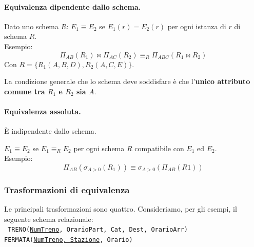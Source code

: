 \documentclass{report}
\begin{document}
\paragraph{Equivalenza dipendente dallo schema.} Dato uno schema $R$:
$E_1 \equiv E_2$ se $E_1(r) = E_2(r)$ per ogni istanza di $r$ di schema $R$.\\
Esempio:
\[ \Pi_{AB}(R_1) \bowtie \Pi_{AC}(R_2) \equiv_R \Pi_{ABC}(R_1 \bowtie R_2) \]
Con $R=\{R_1(A, B, D), R_2(A, C, E)\}$.

La condizione generale che lo schema deve soddisfare \`e che l'\textbf{unico attributo comune tra $R_1$ e $R_2$ sia $A$}.

\paragraph{Equivalenza assoluta.} \`E indipendente dallo schema.

$E_1 \equiv E_2$ se $E_1 \equiv_R E_2$ per ogni schema $R$ compatibile con $E_1$ ed $E_2$.\\
Esempio:
\[ \Pi_{AB}(\sigma_{A>0}(R_1)) \equiv \sigma_{A>0}(\Pi_{AB}(R1))\]


\subsubsection{Trasformazioni di equivalenza}
Le principali trasformazioni sono quattro. Consideriamo, per gli esempi, il seguente schema relazionale:\\
\texttt{
TRENO(\underline{NumTreno}, OrarioPart, Cat, Dest, OrarioArr)\\
FERMATA(\underline{NumTreno, Stazione}, Orario)
}
\end{document}

